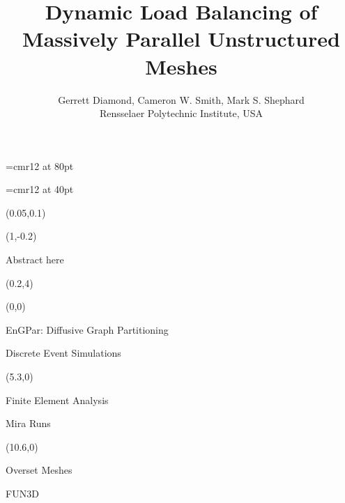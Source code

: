 \documentclass{beamer}
\begin{document}
\font\titlefont=cmr12 at 80pt
\title[Load Balancing of Unstructured Meshes]
{\titlefont
Dynamic Load Balancing of \\[0.3cm]Massively Parallel Unstructured Meshes
}
\font\authorfont=cmr12 at 40pt
\author[G. Diamond]{\authorfont
  Gerrett Diamond, Cameron W. Smith, Mark S. Shephard\\
  Rensselaer Polytechnic Institute, USA}
\date{}

\begin{textblock}{15.8}(0.05,0.1)
\titlepage
\begin{textblock}{14}(1,-0.2)
  \begin{block}{}
    Abstract here
  \end{block}
\end{textblock}
\end{textblock}
\begin{textblock}{15.6}(0.2,4)
  \begin{textblock}{5}(0,0)
    \begin{block}{EnGPar: Diffusive Graph Partitioning}
      
    \end{block}
    \begin{block}{Discrete Event Simulations}

    \end{block}
  \end{textblock}
  \begin{textblock}{5}(5.3,0)
    \begin{block}{Finite Element Analysis}
      
    \end{block}
    \begin{block}{Mira Runs}

    \end{block}
  \end{textblock}
  \begin{textblock}{5}(10.6,0)
    \begin{block}{Overset Meshes}
      
    \end{block}
    \begin{block}{FUN3D}

    \end{block}
  \end{textblock}
\end{textblock}
\end{document}
